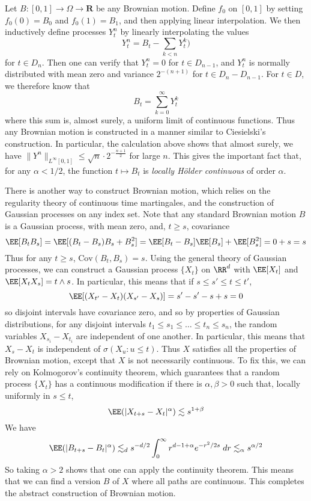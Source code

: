 \begin{remark}
    Let $B: [0,1] \to \Omega \to \mathbf{R}$ be any Brownian motion. Define $f_0$ on $[0,1]$ by setting $f_0(0) = B_0$ and $f_0(1) = B_1$, and then applying linear interpolation. We then inductively define processes $Y^n_t$ by linearly interpolating the values
    \[ Y^n_t = B_t - \sum_{k < n} Y^k_t) \]
    for $t \in D_n$. Then one can verify that $Y^n_t = 0$ for $t \in D_{n-1}$, and $Y^n_t$ is normally distributed with mean zero and variance $2^{-(n+1)}$ for $t \in D_n - D_{n-1}$. For $t \in D$, we therefore know that
    \[ B_t = \sum_{k = 0}^\infty Y^k_t \]
    where this sum is, almost surely, a uniform limit of continuous functions. Thus any Brownian motion is constructed in a manner similar to Ciesielski's construction. In particular, the calculation above shows that almost surely, we have $\| Y^n \|_{L^\infty[0,1]} \leq \sqrt{n} \cdot 2^{- \frac{n+1}{2}}$ for large $n$. This gives the important fact that, for any $\alpha < 1/2$, the function $t \mapsto B_t$ is \emph{locally H\"{o}lder continuous} of order $\alpha$.
\end{remark}

\begin{remark}
    There is another way to construct Brownian motion, which relies on the regularity theory of continuous time martingales, and the construction of Gaussian processes on any index set. Note that any standard Brownian motion $B$ is a Gaussian process, with mean zero, and, $t \geq s$, covariance
    \[ \EE[B_tB_s] = \EE[(B_t - B_s)B_s + B_s^2] = \EE[B_t - B_s] \EE[B_s] + \EE[B_s^2] = 0 + s = s \]
    Thus for any $t \geq s$, $\text{Cov}(B_t,B_s) = s$. Using the general theory of Gaussian processes, we can construct a Gaussian process $\{ X_t \}$ on $\RR^d$ with $\EE[X_t]$ and $\EE[X_tX_s] = t \wedge s$. In particular, this means that if $s \leq s' \leq t \leq t'$,
    \[ \EE[(X_{t'} - X_t)(X_{s'} - X_s)] = s' - s' - s + s = 0 \]
    so disjoint intervals have covariance zero, and so by properties of Gaussian distributions, for any disjoint intervals $t_1 \leq s_1 \leq \dots \leq t_n \leq s_n$, the random variables $X_{s_i} - X_{t_i}$ are independent of one another. In particular, this means that $X_s - X_t$ is independent of $\sigma(X_u: u \leq t)$. Thus $X$ satisfies all the properties of Brownian motion, except that $X$ is not necessarily continuous. To fix this, we can rely on Kolmogorov's continuity theorem, which guarantees that a random process $\{ X_t \}$ has a continuous modification if there is $\alpha, \beta > 0$ such that, locally uniformly in $s \leq t$,
    \[ \EE(|X_{t+s} - X_t|^\alpha) \lesssim s^{1 + \beta} \]
    We have
    \[ \EE( |B_{t+s} - B_t|^\alpha ) \lesssim_d s^{-d/2} \int_0^\infty r^{d-1+\alpha} e^{- r^2 / 2s}\; dr \lesssim_\alpha s^{\alpha/2} \]
    So taking $\alpha > 2$ shows that one can apply the continuity theorem. This means that we can find a version $B$ of $X$ where all paths are continuous. This completes the abstract construction of Brownian motion.
\end{remark}

